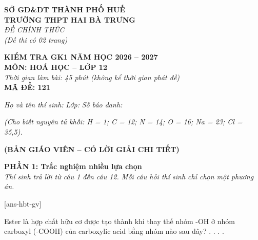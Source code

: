 \documentclass[11pt,a4paper]{article}
\begin{document}
\begin{minipage}[t]{0.48\textwidth}
\textbf{SỞ GD\&ĐT THÀNH PHỐ HUẾ}\\
\textbf{TRƯỜNG THPT HAI BÀ TRƯNG}\\
\textit{ĐỀ CHÍNH THỨC}\\
\textit{(Đề thi có 02 trang)}
\end{minipage}
\hfill
\begin{minipage}[t]{0.48\textwidth}
\raggedleft
\textbf{\color{hfRed}KIỂM TRA GK1 NĂM HỌC 2026 -- 2027}\\
\textbf{MÔN: HOÁ HỌC -- LỚP 12}\\
\textit{Thời gian làm bài: 45 phút (không kể thời gian phát đề)}\\
\textbf{MÃ ĐỀ: 121}
\end{minipage}

\vspace{3pt}
\noindent
\textit{Họ và tên thí sinh:} \dotfill \textit{Lớp:} \dotfill \textit{Số báo danh:} \dotfill

\vspace{2pt}
\noindent
\textit{\footnotesize (Cho biết nguyên tử khối: H = 1; C = 12; N = 14; O = 16; Na = 23; Cl = 35,5).}

\vspace{3pt}
\begin{center}
\textbf{\color{hfRed}\large (BẢN GIÁO VIÊN -- CÓ LỜI GIẢI CHI TIẾT)}
\end{center}

\vspace{3pt}
\noindent
\textbf{\color{mainGreen}PHẦN 1: Trắc nghiệm nhiều lựa chọn}\\
\textit{Thí sinh trả lời từ câu 1 đến câu 12. Mỗi câu hỏi thí sinh chỉ chọn một phương án.}

[ans-hbt-gv]

\begin{ex}
Ester là hợp chất hữu cơ được tạo thành khi thay thế nhóm -OH ở nhóm carboxyl (-COOH) của carboxylic acid bằng nhóm nào sau đây?
\choice
{\True {}.}
{.}
{.}
{.}
\end{ex}
\end{document}
